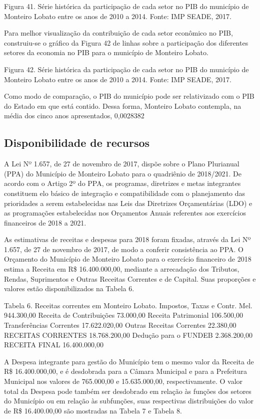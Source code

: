 Figura 41. Série histórica da participação de cada setor no PIB do município de Monteiro Lobato entre os anos de 2010 a 2014.
Fonte: IMP SEADE, 2017.

Para melhor visualização da contribuição de cada setor econômico no PIB, construiu-se o gráfico da Figura 42 de linhas sobre a participação dos diferentes setores da economia no PIB para o município de Monteiro Lobato.

Figura 42. Série histórica da participação de cada setor no PIB do município de Monteiro Lobato entre os anos de 2010 a 2014.
Fonte: IMP SEADE, 2017.

Como modo de comparação, o PIB do município pode ser relativizado com o PIB do Estado em que está contido. Dessa forma, Monteiro Lobato contempla, na média dos cinco anos apresentados, 0,0028382%

\subsection{Disponibilidade de recursos}

A Lei Nº 1.657, de 27 de novembro de 2017, dispõe sobre o Plano Plurianual (PPA) do Município de Monteiro Lobato para o quadriênio de 2018/2021. De acordo com o Artigo 2º do PPA, os programas, diretrizes e metas integrantes constituem elo básico de integração e compatibilidade com o planejamento das prioridades a serem estabelecidas nas Leis das Diretrizes Orçamentárias (LDO) e as programações estabelecidas nos Orçamentos Anuais referentes aos exercícios financeiros de 2018 a 2021.

As estimativas de receitas e despesas para 2018 foram fixadas, através da Lei Nº 1.657, de 27 de novembro de 2017, de modo a conferir consistência ao PPA. O Orçamento do Município de Monteiro Lobato para o exercício financeiro de 2018 estima a Receita em R\$ 16.400.000,00, mediante a arrecadação dos Tributos, Rendas, Suprimentos e Outras Receitas Correntes e de Capital. Suas proporções e valores estão disponibilizados na Tabela 6. 

Tabela 6. Receitas correntes em Monteiro Lobato.
Impostos, Taxas e Contr. Mel.	944.300,00
Receita de Contribuições	73.000,00
Receita Patrimonial	106.500,00
Transferências Correntes	17.622.020,00
Outras Receitas Correntes	22.380,00
RECEITAS CORRENTES	18.768.200,00
Dedução para o FUNDEB	2.368.200,00
RECEITA FINAL	16.400.000,00

A Despesa integrante para gestão do Município tem o mesmo valor da Receita de R\$ 16.400.000,00, e é desdobrada para a Câmara Municipal e para a Prefeitura Municipal nos valores de 765.000,00 e 15.635.000,00, respectivamente. O valor total da Despesa pode também ser desdobrado em relação às funções dos setores do Município ou em relação às subfunções, suas respectivas distribuições do valor de R\$ 16.400.00,00 são mostradas na Tabela 7 e Tabela 8.

